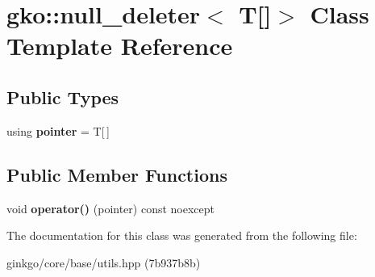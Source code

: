 \hypertarget{classgko_1_1null__deleter_3_01T[]_4}{}\section{gko\+:\+:null\+\_\+deleter$<$ T\mbox{[}\mbox{]}$>$ Class Template Reference}
\label{classgko_1_1null__deleter_3_01T[]_4}
\subsection*{Public Types}
\begin{DoxyCompactItemize}
\item 
\mbox{\label{classgko_1_1null__deleter_3_01T[]_4_a327915073992d00be1ff71150c2792b3}} 
using {\bfseries pointer} = T\mbox{[}$\,$\mbox{]}
\end{DoxyCompactItemize}
\subsection*{Public Member Functions}
\begin{DoxyCompactItemize}
\item 
\mbox{\label{classgko_1_1null__deleter_3_01T[]_4_abce6b34c72d1cb5984b1809787f73012}} 
void {\bfseries operator()} (pointer) const noexcept
\end{DoxyCompactItemize}


The documentation for this class was generated from the following file\+:\begin{DoxyCompactItemize}
\item 
ginkgo/core/base/utils.\+hpp (7b937b8b)\end{DoxyCompactItemize}
